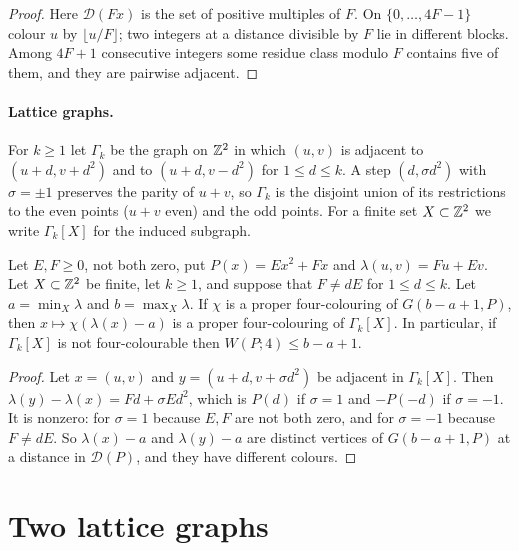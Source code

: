 \documentclass[11pt,colorlinks]{charlie}
\newcommand{\D}{\mathcal D}
\newcommand{\sgn}{\sigma}
\begin{document}
\begin{proof}
Here $\D(Fx)$ is the set of positive multiples of $F$. On $\{0,\dots,4F-1\}$ colour $u$ by $\lfloor u/F\rfloor$; two integers at a distance divisible by $F$ lie in different blocks. Among $4F+1$ consecutive integers some residue class modulo $F$ contains five of them, and they are pairwise adjacent.
\end{proof}

\paragraph{Lattice graphs.}
For $k\ge1$ let $\Gamma_k$ be the graph on $\mathbb{Z}^2$ in which $(u,v)$ is adjacent to $(u+d,v+d^2)$ and to $(u+d,v-d^2)$ for $1\le d\le k$. A step $(d,\sgn d^2)$ with $\sgn=\pm1$ preserves the parity of $u+v$, so $\Gamma_k$ is the disjoint union of its restrictions to the even points ($u+v$ even) and the odd points. For a finite set $X\subset\mathbb{Z}^2$ we write $\Gamma_k[X]$ for the induced subgraph.

\begin{lemma}[Pullback]\label{lem:pullback}
Let $E,F\ge0$, not both zero, put $P(x)=Ex^2+Fx$ and $\lambda(u,v)=Fu+Ev$. Let $X\subset\mathbb{Z}^2$ be finite, let $k\ge1$, and suppose that $F\ne dE$ for $1\le d\le k$. Let $a=\min_X\lambda$ and $b=\max_X\lambda$. If $\chi$ is a proper four-colouring of $G(b-a+1,P)$, then $x\mapsto\chi(\lambda(x)-a)$ is a proper four-colouring of $\Gamma_k[X]$. In particular, if $\Gamma_k[X]$ is not four-colourable then $W(P;4)\le b-a+1$.
\end{lemma}

\begin{proof}
Let $x=(u,v)$ and $y=(u+d,v+\sgn d^2)$ be adjacent in $\Gamma_k[X]$. Then $\lambda(y)-\lambda(x)=Fd+\sgn Ed^2$, which is $P(d)$ if $\sgn=1$ and $-P(-d)$ if $\sgn=-1$. It is nonzero: for $\sgn=1$ because $E,F$ are not both zero, and for $\sgn=-1$ because $F\ne dE$. So $\lambda(x)-a$ and $\lambda(y)-a$ are distinct vertices of $G(b-a+1,P)$ at a distance in $\D(P)$, and they have different colours.
\end{proof}

\section{Two lattice graphs}\label{sec:lattice}
\end{document}
